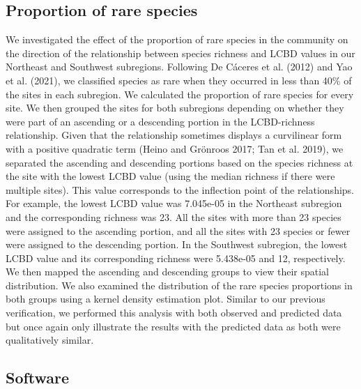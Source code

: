\documentclass[11pt]{article}
\begin{document}
\hypertarget{proportion-of-rare-species}{%
\subsection{Proportion of rare
species}\label{proportion-of-rare-species}}

We investigated the effect of the proportion of rare species in the
community on the direction of the relationship between species richness
and LCBD values in our Northeast and Southwest subregions. Following De
Cáceres et al. (2012) and Yao et al. (2021), we classified species as
rare when they occurred in less than 40\% of the sites in each
subregion. We calculated the proportion of rare species for every site.
We then grouped the sites for both subregions depending on whether they
were part of an ascending or a descending portion in the LCBD-richness
relationship. Given that the relationship sometimes displays a
curvilinear form with a positive quadratic term (Heino and Grönroos
2017; Tan et al. 2019), we separated the ascending and descending
portions based on the species richness at the site with the lowest LCBD
value (using the median richness if there were multiple sites). This
value corresponds to the inflection point of the relationships. For
example, the lowest LCBD value was 7.045e-05 in the Northeast subregion
and the corresponding richness was 23. All the sites with more than 23
species were assigned to the ascending portion, and all the sites with
23 species or fewer were assigned to the descending portion. In the
Southwest subregion, the lowest LCBD value and its corresponding
richness were 5.438e-05 and 12, respectively. We then mapped the
ascending and descending groups to view their spatial distribution. We
also examined the distribution of the rare species proportions in both
groups using a kernel density estimation plot. Similar to our previous
verification, we performed this analysis with both observed and
predicted data but once again only illustrate the results with the
predicted data as both were qualitatively similar.

\hypertarget{software}{%
\subsection{Software}\label{software}}
\end{document}
